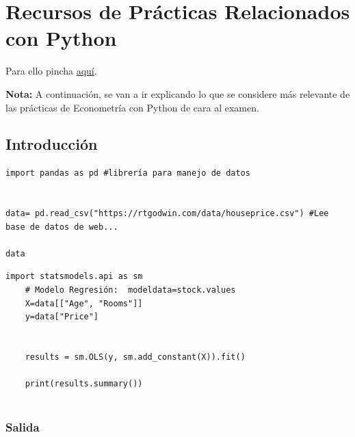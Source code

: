\documentclass[a4paper,12pt]{article}
\begin{document}
\section{Recursos de Prácticas Relacionados con Python}

Para ello pincha \href{https://github.com/ElblogdeIsmael/ElblogdeIsmael.github.io/tree/main/Subjects/Third/ECO/Practicas/Python/econometria-main}{aquí}.

\begin{tcolorbox}[colback=blue!5!white,colframe=blue!75!black, title=Recursos de Prácticas en Econometría con Python]
    \textbf{Nota:} A continuación, se van a ir explicando lo que se considere más relevante de las prácticas de Econometría con Python de cara al examen.
    
\end{tcolorbox}

\subsection{Introducción}


\begin{lstlisting}[style = custompython, caption={Importación de librerías}]
import pandas as pd #librería para manejo de datos


data= pd.read_csv("https://rtgodwin.com/data/houseprice.csv") #Lee base de datos de web...

data
\end{lstlisting}

\begin{lstlisting}[style = custompython, caption={Modelo de Regresión Lineal}]
    import statsmodels.api as sm
    # Modelo Regresión:  modeldata=stock.values
    X=data[["Age", "Rooms"]]
    y=data["Price"]
    
    
    results = sm.OLS(y, sm.add_constant(X)).fit()
    
    print(results.summary())


\end{lstlisting}
\newpage
\subsubsection{Salida}
\end{document}
